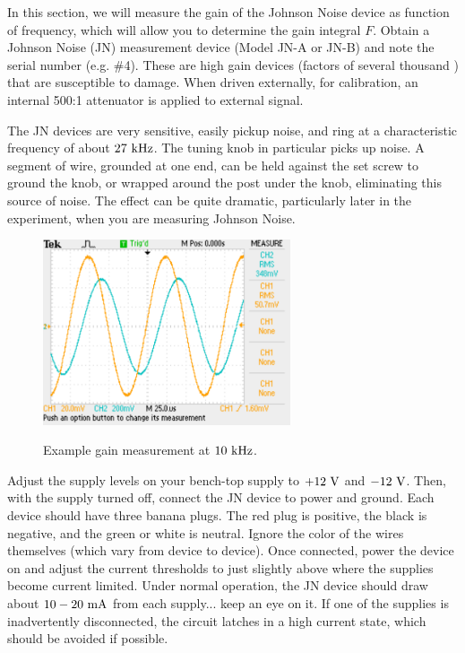 \documentclass[12pt]{article}
\begin{document}
In this section, we will measure the gain of the Johnson Noise device as function of frequency, which will allow you to determine the gain integral $F$.  Obtain a Johnson Noise (JN) measurement device (Model JN-A or JN-B) and note the serial number (e.g. \#4).  These are high gain devices (factors of several thousand ) that are susceptible to damage.  When driven externally, for calibration, an internal 500:1 attenuator is applied to external signal.

The JN devices are very sensitive, easily pickup noise, and ring at a characteristic frequency of about $27~{\rm kHz}$.  The tuning knob in particular picks up noise.  A segment of wire, grounded at one end, can be held against the set screw to ground the knob, or wrapped around the post under the knob, eliminating this source of noise.  The effect can be quite dramatic, particularly later in the experiment, when you are measuring Johnson Noise.

\begin{figure}[htbp]
\begin{center}
{\includegraphics[width=0.65\textwidth]{figs/scope_gain.pdf}}
\end{center}
\caption{\label{fig:scopegain}  Example gain measurement at $10~\rm kHz$.}
\end{figure}

Adjust the supply levels on your bench-top supply to $+12~{\rm V}$ and $-12~{\rm V}$.  Then, with the supply turned off, connect the JN device to power and ground.  Each device should have three banana plugs.  The red plug is positive, the black is negative, and the green or white is neutral.  Ignore the color of the wires themselves (which vary from device to device).  Once connected, power the device on and adjust the current thresholds to just slightly above where the supplies become current limited.  Under normal operation, the JN device should draw about $10-20~\rm mA$ from each supply... keep an eye on it.  If one of the supplies is inadvertently disconnected, the circuit latches in a high current state, which should be avoided if possible.
\end{document}
